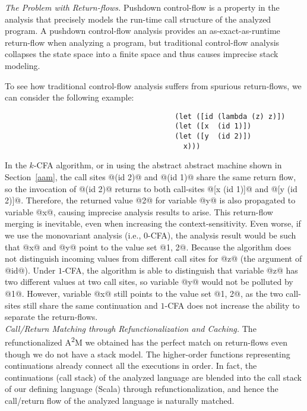 \documentclass[acmsmall, screen]{acmart}\settopmatter{}
\begin{document}
\textit{The Problem with Return-flows.}
Pushdown control-flow is a property in the analysis that precisely models the run-time
call structure of the analyzed program. A pushdown control-flow analysis provides an
as-exact-as-runtime return-flow when analyzing a program, but traditional
control-flow analysis collapses the state space into a finite space and
thus causes imprecise stack modeling.

To see how traditional control-flow analysis suffers from spurious return-flows,
we can consider the following example:

\begin{lstlisting}
                                        (let ([id (lambda (z) z)])
                                        (let ([x  (id 1)])
                                        (let ([y  (id 2)])
                                          x)))
\end{lstlisting}

In the $k$-CFA algorithm, or in using the abstract abstract machine shown in Section~\ref{aam},
the call sites @(id 2)@ and @(id 1)@ share the same return flow, so the invocation
of @(id 2)@ returns to both call-sites @[x (id 1)]@ and @[y (id 2)]@.  Therefore,
the returned value @2@ for variable @y@ is also propagated to variable @x@, causing
imprecise analysis results to arise. This return-flow merging is inevitable, even when
increasing the context-sensitivity. Even worse, if we use the monovariant analysis (i.e.,
$0$-CFA), the analysis result would be such that @x@ and @y@ point to the value set @{1, 2}@.
Because the algorithm does not distinguish incoming values from different call sites
for @z@ (the argument of @id@). Under $1$-CFA, the algorithm is able to distinguish that variable
@z@ has two different values at two call sites, so variable @y@ would not be polluted by
@1@. However, variable @x@ still points to the value set @{1, 2}@, as the two call-sites
still share the same continuation and $1$-CFA does not increase the ability to separate the
return-flows. \\

\textit{Call/Return Matching through Refunctionalization and Caching.}
The refunctionalized A\textsuperscript{2}M we obtained has the perfect match on return-flows even though
we do not have a stack model. The higher-order functions representing continuations
already connect all the executions in order. In fact, the continuations (call stack)
of the analyzed language are blended into the call stack of our defining language
(Scala) through refunctionalization, and hence the call/return flow of the analyzed
language is naturally matched.
\end{document}
